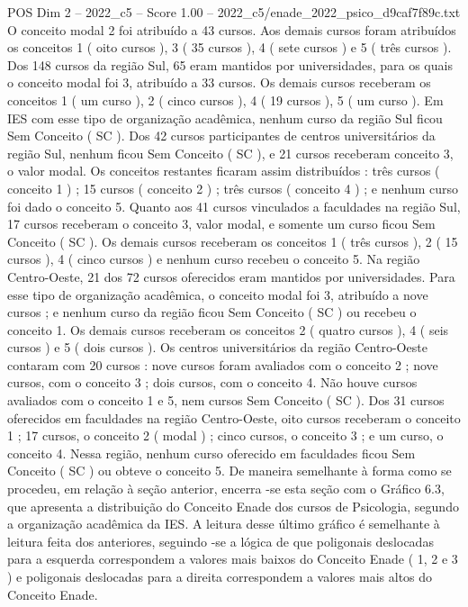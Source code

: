 \begin{textsample}{POS Dim 2 – 2022\_c5 – Score 1.00 – 2022\_c5/enade\_2022\_psico\_d9caf7f89c.txt}
O conceito modal 2 foi atribuído a 43 cursos.
Aos demais cursos foram atribuídos os conceitos 1 ( oito cursos ), 3 ( 35 cursos ), 4 ( sete cursos ) e 5 ( três cursos ).
Dos 148 cursos da região Sul, 65 eram mantidos por universidades, para os quais o conceito modal foi 3, atribuído a 33 cursos.
Os demais cursos receberam os conceitos 1 ( um curso ), 2 ( cinco cursos ), 4 ( 19 cursos ), 5 ( um curso ).
Em IES com esse tipo de organização acadêmica, nenhum curso da região Sul ficou Sem Conceito ( SC ).
Dos 42 cursos participantes de centros universitários da região Sul, nenhum ficou Sem Conceito ( SC ), e 21 cursos receberam conceito 3, o valor modal.
Os conceitos restantes ficaram assim distribuídos : três cursos ( conceito 1 ) ; 15 cursos ( conceito 2 ) ; três cursos ( conceito 4 ) ; e nenhum curso foi dado o conceito 5.
Quanto aos 41 cursos vinculados a faculdades na região Sul, 17 cursos receberam o conceito 3, valor modal, e somente um curso ficou Sem Conceito ( SC ).
Os demais cursos receberam os conceitos 1 ( três cursos ), 2 ( 15 cursos ), 4 ( cinco cursos ) e nenhum curso recebeu o conceito 5.
Na região Centro-Oeste, 21 dos 72 cursos oferecidos eram mantidos por universidades.
Para esse tipo de organização acadêmica, o conceito modal foi 3, atribuído a nove cursos ; e nenhum curso da região ficou Sem Conceito ( SC ) ou recebeu o conceito 1.
Os demais cursos receberam os conceitos 2 ( quatro cursos ), 4 ( seis cursos ) e 5 ( dois cursos ).
Os centros universitários da região Centro-Oeste contaram com 20 cursos : nove cursos foram avaliados com o conceito 2 ; nove cursos, com o conceito 3 ; dois cursos, com o conceito 4.
Não houve cursos avaliados com o conceito 1 e 5, nem cursos Sem Conceito ( SC ).
Dos 31 cursos oferecidos em faculdades na região Centro-Oeste, oito cursos receberam o conceito 1 ; 17 cursos, o conceito 2 ( modal ) ; cinco cursos, o conceito 3 ; e um curso, o conceito 4.
Nessa região, nenhum curso oferecido em faculdades ficou Sem Conceito ( SC ) ou obteve o conceito 5.
De maneira semelhante à forma como se procedeu, em relação à seção anterior, encerra -se esta seção com o Gráfico 6.3, que apresenta a distribuição do Conceito Enade dos cursos de Psicologia, segundo a organização acadêmica da IES.
A leitura desse último gráfico é semelhante à leitura feita dos anteriores, seguindo -se a lógica de que poligonais deslocadas para a esquerda correspondem a valores mais baixos do Conceito Enade ( 1, 2 e 3 ) e poligonais deslocadas para a direita correspondem a valores mais altos do Conceito Enade.

\end{textsample}
